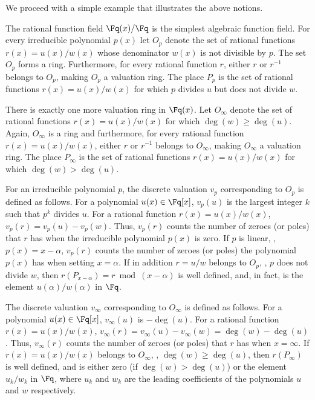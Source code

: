 We proceed with a simple example that illustrates the above notions.
\begin{example}\label{exa:rational}
The rational function field $\Fq(x)/\Fq$ is the simplest algebraic function field.
For every irreducible polynomial
$p(x)$ let $O_p$ denote the set of rational functions
$r(x)={u(x)}/{w(x)}$ whose denominator $w(x)$ is not divisible
by $p$. The set $O_p$ forms a ring. Furthermore, for every rational function
$r$, either $r$ or $r^{-1}$ belongs to $O_p$, making $O_p$ a
valuation ring. The place $P_p$ is the set of rational functions
$r(x)={u(x)}/{w(x)}$ for which $p$ divides $u$ but does not
divide $w$.

There is exactly one more valuation ring in $\Fq(x)$.
Let $O_\infty$ denote the set of rational functions
$r(x)={u(x)}/{w(x)}$ for which $\deg(w) \ge \deg(u)$. Again,
$O_\infty$ is a ring and furthermore, for every rational function
$r(x)= {u(x)}/{w(x)}$, either $r$ or $r^{-1}$ belongs to
$O_\infty$, making $O_\infty$ a valuation ring. The place $P_\infty$
is the set of rational functions $r(x)= {u(x)}/{w(x)}$ for which
$\deg(w) > \deg(u)$.

For an irreducible polynomial $p$, the discrete valuation $v_p$ corresponding to $O_p$ is defined as follows.
For a polynomial $u(x) \in \Fq[x]$, $v_p(u)$ is the largest integer $k$ such that $p^k$ divides
$u$. For a rational function $r(x)= {u(x)}/{w(x)}$,
$v_p(r)=v_p(u)-v_p(w)$. Thus, $v_p(r)$ counts the number of zeroes
(or poles) that $r$ has when the irreducible polynomial $p(x)$ is
zero. If $p$ is linear, \ie, $p(x)=x-\alpha$, $v_p(r)$ counts the
number of zeroes (or poles) the polynomial $p(x)$ has when setting
$x=\alpha$. If in addition $r=u/w$ belongs to $O_p$, \ie, $p$ does
not divide $w$, then $r(P_{x-\alpha})=r \bmod (x-\alpha)$ is well
defined, and, in fact, is the element $u(\alpha)/w(\alpha)$ in
$\Fq$.

The discrete valuation $v_\infty$ corresponding to $O_\infty$ is defined as
follows. For a polynomial $u(x) \in \Fq[x]$, $v_\infty(u)$ is
$-\deg(u)$. For a rational function $r(x)= {u(x)}/{w(x)}$,
$v_\infty(r)=v_\infty(u)-v_\infty(w)=\deg(w)-\deg(u)$. Thus,
$v_\infty(r)$ counts the number of zeroes (or poles) that $r$ has
when $x=\infty$. If $r(x)=u(x)/w(x)$ belongs to $O_\infty$, \ie,
$\deg(w) \ge \deg(u)$, then $r(P_\infty)$ is well defined, and is
either zero (if $\deg(w) > \deg(u)$) or the element $u_k/w_k$ in
$\Fq$, where $u_k$ and $w_k$ are the leading coefficients of the
polynomials $u$ and $w$ respectively.
\end{example}

